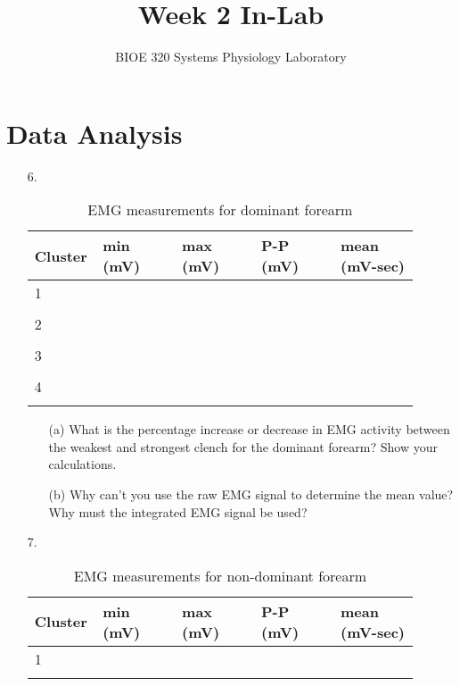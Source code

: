 \documentclass{article}
\title{Week 2 In-Lab}
\author{BIOE 320 Systems Physiology Laboratory}
\date{}
\begin{document}
\large
\maketitle


\section*{Data Analysis}
\begin{itemize}
	\item[6.]
	
	\begin{table}[h!]
	\centering
	\caption{EMG measurements for dominant forearm}
	\begin{tabular}[h!]{p{0.1\linewidth}|p{0.2\linewidth}p{0.2\linewidth}p{0.2\linewidth}p{0.2\linewidth}}
	\toprule
	Cluster & min (mV) & max (mV) & P-P (mV) & mean (mV-sec)\\
	\midrule
	1 & & & &\\& & & &\\
	
	\midrule
	2 & & & &\\& & & &\\
	\midrule
	3 & & & &\\& & & &\\
	\midrule
	4 & & & &\\& & & &\\
	\bottomrule
	\end{tabular}
	\end{table}
	
	\begin{itemize}
		\item[(a)] What is the percentage increase or decrease in EMG activity between the weakest and strongest clench for the dominant forearm? Show your calculations.\vspace{4cm}
		\item[(b)] Why can't you use the raw EMG signal to determine the mean value? Why must the integrated EMG signal be used?\pagebreak
	\end{itemize}
	
	\item[7.]
	\begin{table}[h!]
	\centering
	\caption{EMG measurements for non-dominant forearm}
	\begin{tabular}[h!]{p{0.1\linewidth}|p{0.2\linewidth}p{0.2\linewidth}p{0.2\linewidth}p{0.2\linewidth}}
	\toprule
	Cluster & min (mV) & max (mV) & P-P (mV) & mean (mV-sec)\\
	\midrule
	1 & & & &\\& & & &\\
	

\end{tabular}
\end{table}
\end{itemize}
\end{document}
